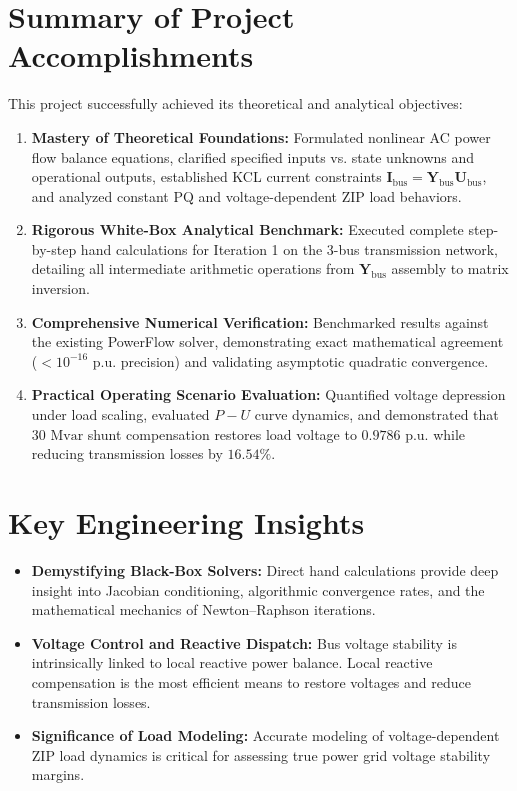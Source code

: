 \documentclass[12pt,a4paper,oneside]{report}
\begin{document}
\section{Summary of Project Accomplishments}
This project successfully achieved its theoretical and analytical objectives:
\begin{enumerate}
    \item \textbf{Mastery of Theoretical Foundations:} Formulated nonlinear AC power flow balance equations, clarified specified inputs vs. state unknowns and operational outputs, established KCL current constraints $\mathbf{I}_{\text{bus}} = \mathbf{Y}_{\text{bus}}\mathbf{U}_{\text{bus}}$, and analyzed constant PQ and voltage-dependent ZIP load behaviors.
    \item \textbf{Rigorous White-Box Analytical Benchmark:} Executed complete step-by-step hand calculations for Iteration 1 on the 3-bus transmission network, detailing all intermediate arithmetic operations from $\mathbf{Y}_{\text{bus}}$ assembly to matrix inversion.
    \item \textbf{Comprehensive Numerical Verification:} Benchmarked results against the existing PowerFlow solver, demonstrating exact mathematical agreement ($< 10^{-16}\text{ p.u.}$ precision) and validating asymptotic quadratic convergence.
    \item \textbf{Practical Operating Scenario Evaluation:} Quantified voltage depression under load scaling, evaluated $P-U$ curve dynamics, and demonstrated that $30\text{ Mvar}$ shunt compensation restores load voltage to $0.9786\text{ p.u.}$ while reducing transmission losses by $16.54\%$.
\end{enumerate}

\section{Key Engineering Insights}
\begin{itemize}
    \item \textbf{Demystifying Black-Box Solvers:} Direct hand calculations provide deep insight into Jacobian conditioning, algorithmic convergence rates, and the mathematical mechanics of Newton--Raphson iterations.
    \item \textbf{Voltage Control and Reactive Dispatch:} Bus voltage stability is intrinsically linked to local reactive power balance. Local reactive compensation is the most efficient means to restore voltages and reduce transmission losses.
    \item \textbf{Significance of Load Modeling:} Accurate modeling of voltage-dependent ZIP load dynamics is critical for assessing true power grid voltage stability margins.
\end{itemize}
\end{document}
